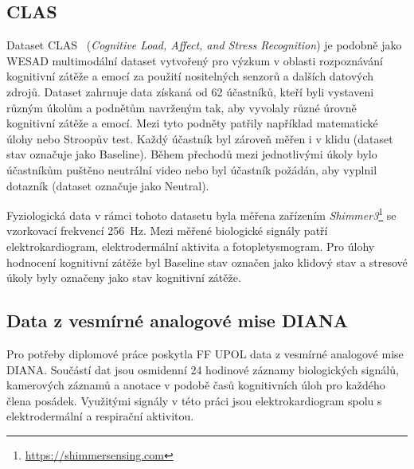 \subsection{CLAS}
\label{subsec:clas}
Dataset CLAS~\cite{clasDataset} (\textit{Cognitive Load, Affect, and Stress
Recognition}) je podobně jako WESAD multimodální dataset vytvořený pro výzkum v
oblasti rozpoznávání kognitivní zátěže a emocí za použití nositelných senzorů a
dalších datových zdrojů. Dataset zahrnuje data získaná od 62 účastníků, kteří
byli vystaveni různým úkolům a podnětům navrženým tak, aby vyvolaly různé úrovně
kognitivní zátěže a emocí. Mezi tyto podněty patřily například matematické úlohy
nebo Stroopův test. Každý účastník byl zároveň měřen i v klidu (dataset stav
označuje jako Baseline). Během přechodů mezi jednotlivými úkoly bylo účastníkům
puštěno neutrální video nebo byl účastník požádán, aby vyplnil dotazník (dataset
označuje jako Neutral). 

Fyziologická data v rámci tohoto datasetu byla měřena zařízením
\textit{Shimmer3}\footnote{\url{https://shimmersensing.com}} se vzorkovací
frekvencí 256~Hz. Mezi měřené biologické signály patří elektrokardiogram,
elektrodermální aktivita a fotopletysmogram. Pro úlohy hodnocení kognitivní
zátěže byl Baseline stav označen jako klidový stav a stresové úkoly byly
označeny jako stav kognitivní zátěže. 

\subsection{Data z vesmírné analogové mise DIANA}
\label{subsec:data_diana}
Pro potřeby diplomové práce poskytla \gls{FF UPOL} data z vesmírné analogové
mise DIANA. Součástí dat jsou osmidenní 24 hodinové záznamy biologických
signálů, kamerových záznamů a anotace v podobě časů kognitivních úloh pro
každého člena posádek. Využitými signály v této práci jsou elektrokardiogram
spolu s elektrodermální a respirační aktivitou.